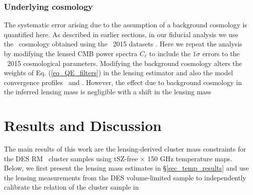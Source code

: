 \subsubsection{Underlying cosmology}\label{subsec_others}
The systematic error arising due to the assumption of a background cosmology is quantified here.
As described in earlier sections, in our fiducial analysis we use the \lcdm\ cosmology obtained using the \planck\ 2015 datasets \citep{planck15-13}. 
Here we repeat the analysis by modifying the lensed CMB power spectra $C_{\ell}$ to include the $1\sigma$ errors to the \planck\ 2015 cosmological parameters.
Modifying the background cosmology alters the weights of Eq. (\ref{eq_QE_filters}) in the lensing estimator and also the model convergence profiles \kappaonehalomz\ and \kappatwohalomz. 
However, the effect due to background cosmology in the inferred lensing mass is negligible with a shift in the lensing mass %

  \section{Results and Discussion}\label{mqe_sec_results}

The main results of this work are the lensing-derived cluster mass constraints for the DES RM \whichyear\ cluster samples using \sptpol{} tSZ-free $\times$ 150 GHz temperature maps.
Below, we first present the lensing mass estimates in \S\ref{sec_temp_results} and use the lensing measurements from the DES \whichyear{} volume-limited sample to independently calibrate the \ML{} relation of the cluster sample in %
